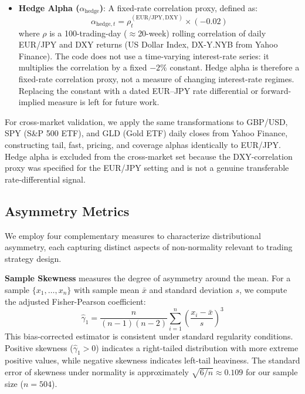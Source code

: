 \documentclass[11pt]{article}
\begin{document}
\begin{itemize}
    \item \textbf{Hedge Alpha ($\alpha_{\text{hedge}}$)}: A fixed-rate correlation proxy, defined as:
    \begin{equation}
        \alpha_{\text{hedge},t} = \rho_{t}^{(\text{EUR/JPY}, \text{DXY})} \times (-0.02)
    \end{equation}
    where $\rho$ is a 100-trading-day ($\approx$20-week) rolling correlation of daily EUR/JPY and DXY returns (US Dollar Index, DX-Y.NYB from Yahoo Finance). The code does not use a time-varying interest-rate series: it multiplies the correlation by a fixed $-2\%$ constant. Hedge alpha is therefore a fixed-rate correlation proxy, not a measure of changing interest-rate regimes. Replacing the constant with a dated EUR--JPY rate differential or forward-implied measure is left for future work.
\end{itemize}

For cross-market validation, we apply the same transformations to GBP/USD, SPY (S\&P 500 ETF), and GLD (Gold ETF) daily closes from Yahoo Finance, constructing tail, fast, pricing, and coverage alphas identically to EUR/JPY. Hedge alpha is excluded from the cross-market set because the DXY-correlation proxy was specified for the EUR/JPY setting and is not a genuine transferable rate-differential signal.

\subsection{Asymmetry Metrics}

We employ four complementary measures to characterize distributional asymmetry, each capturing distinct aspects of non-normality relevant to trading strategy design.

\textbf{Sample Skewness} measures the degree of asymmetry around the mean. For a sample $\{x_1, \ldots, x_n\}$ with sample mean $\bar{x}$ and standard deviation $s$, we compute the adjusted Fisher-Pearson coefficient:
\begin{equation}
    \hat{\gamma}_1 = \frac{n}{(n-1)(n-2)} \sum_{i=1}^{n} \left( \frac{x_i - \bar{x}}{s} \right)^3
\end{equation}
This bias-corrected estimator is consistent under standard regularity conditions. Positive skewness ($\hat{\gamma}_1 > 0$) indicates a right-tailed distribution with more extreme positive values, while negative skewness indicates left-tail heaviness. The standard error of skewness under normality is approximately $\sqrt{6/n} \approx 0.109$ for our sample size ($n = 504$).
\end{document}

